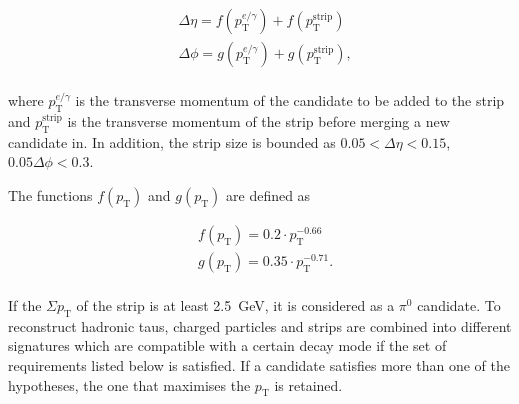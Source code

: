 \begin{equation}\label{eqn:dynamicstrip}
\begin{split}
&\Delta \eta  = f(p_{\text{T}}^{e/\gamma}) + f(p_{\text{T}}^{\text{strip}})\\
&\Delta \phi  = g(p_{\text{T}}^{e/\gamma}) + g(p_{\text{T}}^{\text{strip}}),\\
\end{split}
\end{equation}

where $p_{\text{T}}^{e/\gamma}$ is the transverse momentum of the candidate to be added to the strip 
and $p_{\text{T}}^{\text{strip}}$ is the transverse momentum of the strip before merging a new candidate in.
In addition, the strip size is bounded as $0.05 < \Delta\eta < 0.15$, $0.05 \Delta\phi < 0.3$.

The functions $f(p_{\text{T}})$ and $g(p_{\text{T}})$ are defined as

\begin{equation}\label{eqn:dynamicstripfg}
\begin{split}
&f(p_{\text{T}}) = 0.2\cdot p_{\text{T}}^{-0.66}\\
&g(p_{\text{T}}) = 0.35\cdot p_{\text{T}}^{-0.71}.\\
\end{split}
\end{equation}

If the $\Sigma p_{\text{T}}$ of the strip is at least 2.5~GeV, it is considered as a $\pi^0$ candidate.
 To reconstruct hadronic taus, charged particles and strips are combined into different signatures which are
compatible with a certain decay mode if the set of requirements listed below is satisfied. If a candidate satisfies more than one of the hypotheses, the one that maximises the $p_{\text{T}}$ is retained.

